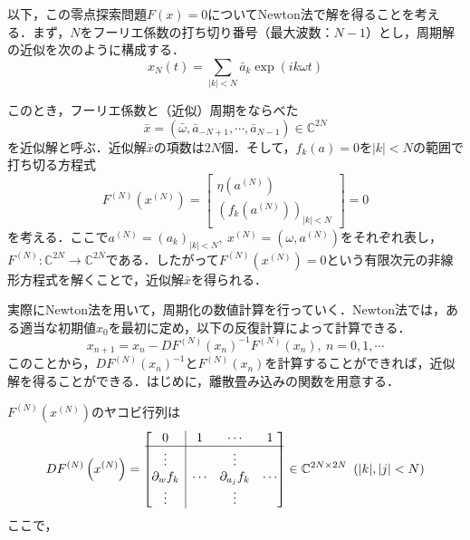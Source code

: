 \documentclass[11pt,a4paper,titlepage]{jsreport}
\theoremstyle{definition}
\begin{document}
以下，この零点探索問題$F(x)=0$についてNewton法で解を得ることを考える．まず，$N$をフーリエ係数の打ち切り番号（最大波数：$N-1$）とし，周期解の近似を次のように構成する．
\begin{equation*}
  x_N(t) = \sum_{|k|<N} \bar{a}_k \exp(ik\omega t)
\end{equation*}

このとき，フーリエ係数と（近似）周期をならべた
\begin{equation*}
  \bar{x} = \left(\bar{\omega},\bar{a}_{-N+1},\cdots,\bar{a}_{N-1}\right) \in \mathbb{C}^{2N}
\end{equation*}
を近似解と呼ぶ．近似解$\bar{x}$の項数は$2N$個．そして，$f_k(a)=0$を$|k|<N$の範囲で打ち切る方程式
\begin{equation*}
  F^{(N)}\left(x^{(N)}\right) = \begin{bmatrix}
    \eta\left(a^{(N)}\right) \\
    \left(f_k(a^{(N)})\right)_{|k|<N}
  \end{bmatrix}
  = 0
\end{equation*}
を考える．ここで$a^{(N)}=\left(a_k\right)_{|k|<N},\ x^{(N)}=\left(\omega, a^{(N)}\right)$をそれぞれ表し，$F^{(N)}:\mathbb{C}^{2N}\rightarrow\mathbb{C}^{2N}$である．したがって$F^{(N)}\left(x^{(N)}\right)=0$という有限次元の非線形方程式を解くことで，近似解$\bar{x}$を得られる．

実際にNewton法を用いて，周期化の数値計算を行っていく．Newton法では，ある適当な初期値$x_0$を最初に定め，以下の反復計算によって計算できる．
\begin{equation*}
  x_{n+1} = x_n - DF^{(N)}\left(x_n\right)^{-1} F^{(N)}\left(x_n\right),\ n=0,1,\cdots
\end{equation*}
このことから，$DF^{(N)}\left(x_n\right)^{-1}$と$F^{(N)}\left(x_n\right)$を計算することができれば，近似解を得ることができる．はじめに，離散畳み込みの関数を用意する．

$F^{(N)}(x^{(N)})$のヤコビ行列は
\begin{equation*}
  DF^{(N)}\left(x^{(N)}\right)=\begin{bmatrix}
    \multicolumn{1}{c|}{0}              & 1      & \cdots            & 1      \\ \hline
    \multicolumn{1}{c|}{\vdots}         &        & \vdots            &        \\
    \multicolumn{1}{c|}{\partial_w f_k} & \cdots & \partial_{a_j}f_k & \cdots \\
    \multicolumn{1}{c|}{\vdots}         &        & \vdots            &        \\
  \end{bmatrix} \in \mathbb{C}^{2N\times 2N}\ \left(|k|,|j|<N\right)
\end{equation*}
ここで，
\end{document}
